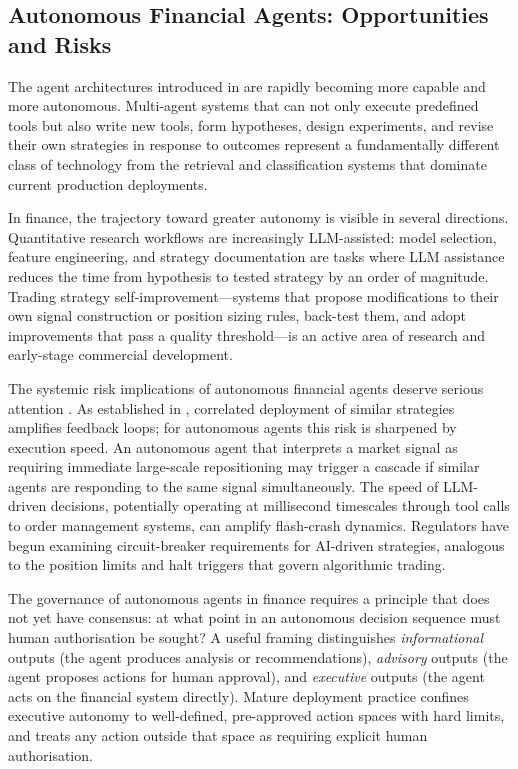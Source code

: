 \begin{context}
\subsection{Autonomous Financial Agents: Opportunities and Risks}
\label{subsec:af-future-autonomous}

The agent architectures introduced in  are rapidly becoming more capable and more autonomous. Multi-agent systems that can not only execute predefined tools but also write new tools, form hypotheses, design experiments, and revise their own strategies in response to outcomes represent a fundamentally different class of technology from the retrieval and classification systems that dominate current production deployments.

In finance, the trajectory toward greater autonomy is visible in several directions. Quantitative research workflows are increasingly LLM-assisted: model selection, feature engineering, and strategy documentation are tasks where LLM assistance reduces the time from hypothesis to tested strategy by an order of magnitude. Trading strategy self-improvement---systems that propose modifications to their own signal construction or position sizing rules, back-test them, and adopt improvements that pass a quality threshold---is an active area of research and early-stage commercial development.

The systemic risk implications of autonomous financial agents deserve serious attention \cite{bommasani2021opportunities,LopezLira2025trade}. As established in , correlated deployment of similar strategies amplifies feedback loops; for autonomous agents this risk is sharpened by execution speed. An autonomous agent that interprets a market signal as requiring immediate large-scale repositioning may trigger a cascade if similar agents are responding to the same signal simultaneously. The speed of LLM-driven decisions, potentially operating at millisecond timescales through tool calls to order management systems, can amplify flash-crash dynamics. Regulators have begun examining circuit-breaker requirements for AI-driven strategies, analogous to the position limits and halt triggers that govern algorithmic trading.

The governance of autonomous agents in finance requires a principle that does not yet have consensus: at what point in an autonomous decision sequence must human authorisation be sought? A useful framing distinguishes \emph{informational} outputs (the agent produces analysis or recommendations), \emph{advisory} outputs (the agent proposes actions for human approval), and \emph{executive} outputs (the agent acts on the financial system directly). Mature deployment practice confines executive autonomy to well-defined, pre-approved action spaces with hard limits, and treats any action outside that space as requiring explicit human authorisation.


\end{context}
